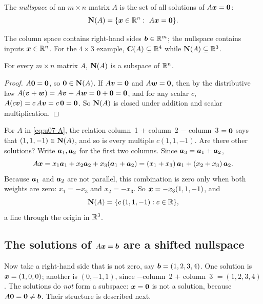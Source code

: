 \begin{definition}[Nullspace]\label{def:u07-nullspace}
The \emph{nullspace} of an $m\times n$ matrix $A$ is the set of all solutions of
$A\boldsymbol{x}=\boldsymbol{0}$:
\[
  \Nul{A}=\{\vb{x}\in\R^n:\ A\vb{x}=\vb{0}\}.
\]
\end{definition}

The column space contains right-hand sides $\boldsymbol{b}\in\mathbb{R}^m$; the nullspace contains inputs
$\boldsymbol{x}\in\mathbb{R}^n$. For the $4\times3$ example, $\mathbf{C}(A)\subseteq\mathbb{R}^4$ while
$\mathbf{N}(A)\subseteq\mathbb{R}^3$.

\begin{theorem}\label{thm:u07-nullspace}
For every $m\times n$ matrix $A$, $\mathbf{N}(A)$ is a subspace of $\mathbb{R}^n$.
\end{theorem}

\begin{proof}
$A\boldsymbol{0}=\boldsymbol{0}$, so $\boldsymbol{0}\in\mathbf{N}(A)$. If $A\boldsymbol{v}=\boldsymbol{0}$ and $A\boldsymbol{w}=\boldsymbol{0}$, then by the
distributive law $A(\boldsymbol{v}+\boldsymbol{w})=A\boldsymbol{v}+A\boldsymbol{w}=\boldsymbol{0}+\boldsymbol{0}=\boldsymbol{0}$, and for any scalar
$c$, $A(c\boldsymbol{v})=c\,A\boldsymbol{v}=c\,\boldsymbol{0}=\boldsymbol{0}$. So $\mathbf{N}(A)$ is closed under addition and scalar
multiplication.
\end{proof}

\begin{example}\label{ex:u07-nullspace}
For $A$ in \eqref{eq:u07-A}, the relation column~1 $+$ column~2 $-$ column~3 $=\boldsymbol{0}$ says
that $(1,1,-1)\in\mathbf{N}(A)$, and so is every multiple $c(1,1,-1)$. Are there other solutions?
Write $\boldsymbol{a}_1,\boldsymbol{a}_2$ for the first two columns. Since $\boldsymbol{a}_3=\boldsymbol{a}_1+\boldsymbol{a}_2$,
\[
  A\boldsymbol{x}=x_1\boldsymbol{a}_1+x_2\boldsymbol{a}_2+x_3(\boldsymbol{a}_1+\boldsymbol{a}_2)=(x_1+x_3)\,\boldsymbol{a}_1+(x_2+x_3)\,\boldsymbol{a}_2 .
\]
Because $\boldsymbol{a}_1$ and $\boldsymbol{a}_2$ are not parallel, this combination is zero only when both
weights are zero: $x_1=-x_3$ and $x_2=-x_3$. So $\boldsymbol{x}=-x_3(1,1,-1)$, and
\[
  \mathbf{N}(A)=\{c\,(1,1,-1):c\in\mathbb{R}\},
\]
a line through the origin in $\mathbb{R}^3$.
\end{example}

\subsection{The solutions of \texorpdfstring{\(A\boldsymbol{x}=\boldsymbol{b}\)}{Ax = b} are a shifted nullspace}

Now take a right-hand side that is not zero, say $\boldsymbol{b}=(1,2,3,4)$. One solution is
$\boldsymbol{x}=(1,0,0)$; another is $(0,-1,1)$, since $-$column~2 $+$ column~3 $=(1,2,3,4)$. The
solutions do \emph{not} form a subspace: $\boldsymbol{x}=\boldsymbol{0}$ is not a solution, because
$A\boldsymbol{0}=\boldsymbol{0}\neq\boldsymbol{b}$. Their structure is described next.

